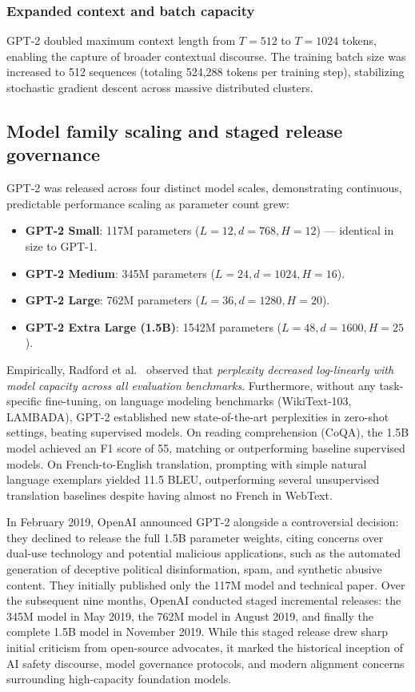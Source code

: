\documentclass[../../main.tex]{subfiles}
\begin{document}
\subsubsection{Expanded context and batch capacity}
GPT-2 doubled maximum context length from $T = 512$ to $T = 1024$ tokens, enabling the capture of broader contextual discourse. The training batch size was increased to 512 sequences (totaling 524,288 tokens per training step), stabilizing stochastic gradient descent across massive distributed clusters.

\subsection{Model family scaling and staged release governance}
\label{subsec:gpt2_scaling_governance}

GPT-2 was released across four distinct model scales, demonstrating continuous, predictable performance scaling as parameter count grew:
\begin{itemize}
    \item \textbf{GPT-2 Small}: 117M parameters ($L = 12, d = 768, H = 12$) --- identical in size to GPT-1.
    \item \textbf{GPT-2 Medium}: 345M parameters ($L = 24, d = 1024, H = 16$).
    \item \textbf{GPT-2 Large}: 762M parameters ($L = 36, d = 1280, H = 20$).
    \item \textbf{GPT-2 Extra Large (1.5B)}: 1542M parameters ($L = 48, d = 1600, H = 25$).
\end{itemize}

Empirically, Radford et al.~\cite{radford2019} observed that \emph{perplexity decreased log-linearly with model capacity across all evaluation benchmarks}. Furthermore, without any task-specific fine-tuning, on language modeling benchmarks (WikiText-103, LAMBADA), GPT-2 established new state-of-the-art perplexities in zero-shot settings, beating supervised models. On reading comprehension (CoQA), the 1.5B model achieved an F1 score of 55, matching or outperforming baseline supervised models. On French-to-English translation, prompting with simple natural language exemplars yielded 11.5 BLEU, outperforming several unsupervised translation baselines despite having almost no French in WebText.

In February 2019, OpenAI announced GPT-2 alongside a controversial decision: they declined to release the full 1.5B parameter weights, citing concerns over dual-use technology and potential malicious applications, such as the automated generation of deceptive political disinformation, spam, and synthetic abusive content. They initially published only the 117M model and technical paper. Over the subsequent nine months, OpenAI conducted staged incremental releases: the 345M model in May 2019, the 762M model in August 2019, and finally the complete 1.5B model in November 2019. While this staged release drew sharp initial criticism from open-source advocates, it marked the historical inception of AI safety discourse, model governance protocols, and modern alignment concerns surrounding high-capacity foundation models.
\end{document}
